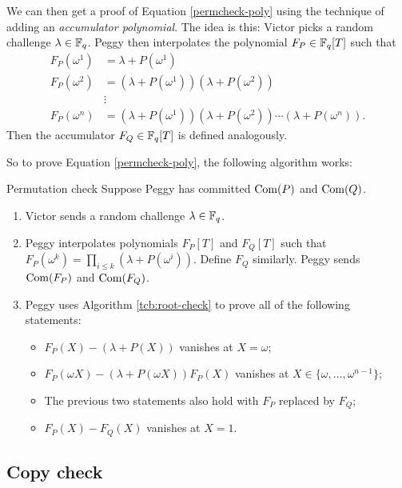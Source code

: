 We can then get a proof of
Equation \eqref{permcheck-poly} using the technique of
adding an \emph{accumulator polynomial}. The idea is this: Victor picks
a random challenge $\lambda \in \mathbb{F}_{q}$. Peggy then
interpolates the polynomial
$F_{P} \in \mathbb{F}_{q}[T]$ such that
\[\begin{aligned}
F_{P}( \omega^{1} ) & = \lambda + P( \omega^{1} ) \\
F_{P}( \omega^{2} ) & = ( \lambda + P( \omega^{1} ) )( \lambda + P( \omega^{2} ) ) \\
 & \vdots \\
F_{P}( \omega^{n} ) & = ( \lambda + P( \omega^{1} ) )( \lambda + P( \omega^{2} ) )\cdots( \lambda + P( \omega^{n} ) ).
\end{aligned}\] Then the accumulator
$F_{Q} \in \mathbb{F}_{q}[T]$ is defined analogously.

So to prove Equation \eqref{permcheck-poly}, the
following algorithm works:

\begin{algo}{Permutation check}{}
Suppose Peggy has committed $\operatorname{Com}(P)$
and $\operatorname{Com}(Q)$.

\begin{enumerate}
\item
  Victor sends a random challenge $\lambda \in \mathbb{F}_{q}$.
\item
  Peggy interpolates polynomials $F_{P}[T]$ and
  $F_{Q}[T]$ such that
  $F_{P}( \omega^{k} ) = \prod_{i \leq k}( \lambda + P( \omega^{i} ) )$.
  Define $F_{Q}$ similarly. Peggy sends $\operatorname{Com}(F_{P})$
  and $\operatorname{Com}(F_{Q})$.
\item
  Peggy uses Algorithm \ref{tcb:root-check} to prove all of the following statements:

  \begin{itemize}
  \item
    $F_{P}(X) - ( \lambda + P(X) )$ vanishes at
    $X = \omega$;
  \item
    $F_{P}(\omega X) - ( \lambda + P(\omega X) )F_{P}(X)$
    vanishes at $X \in \{ \omega,\ldots,\omega^{n - 1} \}$;
  \item
    The previous two statements also hold with $F_{P}$ replaced by
    $F_{Q}$;
  \item
    $F_{P}(X) - F_{Q}(X)$ vanishes at $X = 1$.
  \end{itemize}
\end{enumerate}
\end{algo}

\subsection{Copy check}

